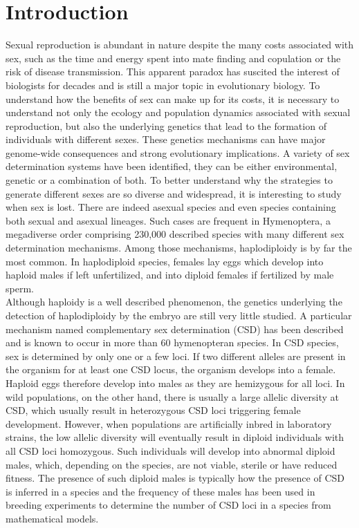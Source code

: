 \documentclass[11pt,a4paper]{report}
\begin{document}
\section*{Introduction}
Sexual reproduction is abundant in nature despite the many costs associated with sex, such as the time and energy spent into mate finding and copulation or the risk of disease transmission. This apparent paradox has suscited the interest of biologists for decades and is still a major topic in evolutionary biology. To understand how the benefits of sex can make up for its costs, it is necessary to understand not only the ecology and population dynamics associated with sexual reproduction, but also the underlying genetics that lead to the formation of individuals with different sexes. These genetics mechanisms can have major genome-wide consequences and strong evolutionary implications. A variety of sex determination systems have been identified, they can be either environmental, genetic or a combination of both. To better understand why the strategies to generate different sexes are so diverse and widespread, it is interesting to study when sex is lost. There are indeed asexual species and even species containing both sexual and asexual lineages. Such cases are frequent in Hymenoptera, a megadiverse order comprising 230,000 described species with many different sex determination mechanisms. Among those mechanisms, haplodiploidy is by far the most common. In haplodiploid species, females lay eggs which develop into haploid males if left unfertilized, and into diploid females if fertilized by male sperm. \\
Although haploidy is a well described phenomenon, the genetics underlying the detection of haplodiploidy by the embryo are still very little studied. A particular mechanism named complementary sex determination (CSD) has been described and is known to occur in more than 60 hymenopteran species. In CSD species, sex is determined by only one or a few loci. If two different alleles are present in the organism for at least one CSD locus, the organism develops into a female. Haploid eggs therefore develop into males as they are hemizygous for all loci. In wild populations, on the other hand, there is usually a large allelic diversity at CSD, which usually result in heterozygous CSD loci triggering female development. However, when populations are artificially inbred in laboratory strains, the low allelic diversity will eventually result in diploid individuals with all CSD loci homozygous. Such individuals will develop into abnormal diploid males, which, depending on the species, are not viable, sterile or have reduced fitness. The presence of such diploid males is typically how the presence of CSD is inferred in a species and the frequency of these males has been used in breeding experiments to determine the number of CSD loci in a species from mathematical models.\\
\end{document}
